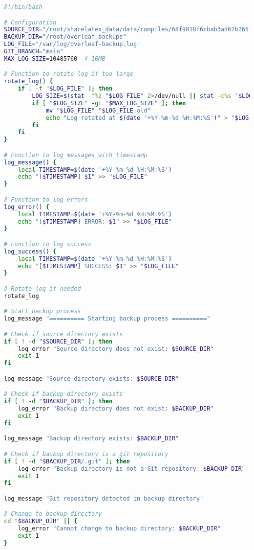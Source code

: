 \begin{lstlisting}[language=bash]
#!/bin/bash

# Configuration
SOURCE_DIR="/root/sharelatex_data/data/compiles/68f9818f6cbab3ad67b265f7-68f14753eda193f7e7fa0355"
BACKUP_DIR="/root/overleaf_backups"
LOG_FILE="/var/log/overleaf-backup.log"
GIT_BRANCH="main"
MAX_LOG_SIZE=10485760  # 10MB

# Function to rotate log if too large
rotate_log() {
    if [ -f "$LOG_FILE" ]; then
        LOG_SIZE=$(stat -f%z "$LOG_FILE" 2>/dev/null || stat -c%s "$LOG_FILE" 2>/dev/null)
        if [ "$LOG_SIZE" -gt "$MAX_LOG_SIZE" ]; then
            mv "$LOG_FILE" "$LOG_FILE.old"
            echo "Log rotated at $(date '+%Y-%m-%d %H:%M:%S')" > "$LOG_FILE"
        fi
    fi
}

# Function to log messages with timestamp
log_message() {
    local TIMESTAMP=$(date '+%Y-%m-%d %H:%M:%S')
    echo "[$TIMESTAMP] $1" >> "$LOG_FILE"
}

# Function to log errors
log_error() {
    local TIMESTAMP=$(date '+%Y-%m-%d %H:%M:%S')
    echo "[$TIMESTAMP] ERROR: $1" >> "$LOG_FILE"
}

# Function to log success
log_success() {
    local TIMESTAMP=$(date '+%Y-%m-%d %H:%M:%S')
    echo "[$TIMESTAMP] SUCCESS: $1" >> "$LOG_FILE"
}

# Rotate log if needed
rotate_log

# Start backup process
log_message "========== Starting backup process =========="

# Check if source directory exists
if [ ! -d "$SOURCE_DIR" ]; then
    log_error "Source directory does not exist: $SOURCE_DIR"
    exit 1
fi

log_message "Source directory exists: $SOURCE_DIR"

# Check if backup directory exists
if [ ! -d "$BACKUP_DIR" ]; then
    log_error "Backup directory does not exist: $BACKUP_DIR"
    exit 1
fi

log_message "Backup directory exists: $BACKUP_DIR"

# Check if backup directory is a git repository
if [ ! -d "$BACKUP_DIR/.git" ]; then
    log_error "Backup directory is not a Git repository: $BACKUP_DIR"
    exit 1
fi

log_message "Git repository detected in backup directory"

# Change to backup directory
cd "$BACKUP_DIR" || {
    log_error "Cannot change to backup directory: $BACKUP_DIR"
    exit 1
}


\end{lstlisting}
